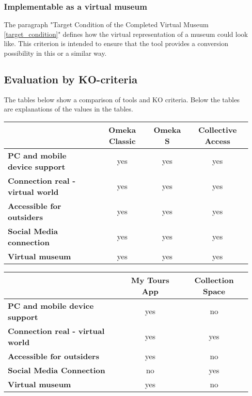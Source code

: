 \subsubsection{Implementable as a virtual museum}
The paragraph "Target Condition of the Completed Virtual Museum \ref{target_condition}" defines how the virtual representation of a museum could look like. This criterion is intended to ensure that the tool provides a conversion possibility in this or a similar way.

\subsection{Evaluation by KO-criteria}
The tables below show a comparison of tools and KO criteria. Below the tables are explanations of the values in the tables.

\vspace{0.5cm}
\begin{tabular}[h]{l|c|c|c}
     & \textbf{Omeka Classic} & \textbf{Omeka S} & \textbf{Collective Access}\\
     \hline
    \textbf{PC and mobile device support} & yes & yes & yes\\
     \hline
    \textbf{Connection real - virtual world} & yes & yes & yes\\
     \hline
    \textbf{Accessible for outsiders} & yes & yes & yes\\
     \hline
    \textbf{Social Media connection} & yes & yes & yes\\
     \hline
    \textbf{Virtual museum} & yes & yes & yes\\
\end{tabular}


\vspace{0.5cm}
\begin{tabular}[h]{l|c|c}
     & \textbf{My Tours App} & \textbf{Collection Space}\\
     \hline
    \textbf{PC and mobile device support} & yes & no\\
     \hline
    \textbf{Connection real - virtual world} & yes & yes\\
     \hline
    \textbf{Accessible for outsiders} & yes & no\\
     \hline
    \textbf{Social Media Connection} & no & yes\\
     \hline
    \textbf{Virtual museum} & yes & no\\
\end{tabular}

